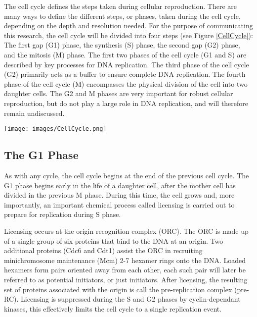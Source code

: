	The cell cycle defines the steps taken during cellular reproduction.
	There are many ways to define the different steps, or phases, taken during the cell cycle, depending on the depth and resolution needed.
	For the purpose of communicating this research, the cell cycle will be divided into four steps (see Figure \ref{CellCycle}):
	The first gap (G1) phase, the synthesis (S) phase, the second gap (G2) phase, and the mitosis (M) phase.
	The first two phases of the cell cycle (G1 and S) are described by key processes for DNA replication.
	The third phase of the cell cycle (G2) primarily acts as a buffer to ensure complete DNA replication.
	The fourth phase of the cell cycle (M) encompasses the physical division of the cell into two daughter cells.
	The G2 and M phases are very important for robust cellular reproduction, but do not play a large role in DNA replication, and will therefore remain undiscussed.
	
	\begin{SCfigure}[1][thb]
		\texttt{[image: images/CellCycle.png]}
		\caption[Cell Cycle]{\label{CellCycle} The complete cell cycle is made up of four phases: 
			The Mitosis (M) phase, when a mother cell separates into two daughter cells. 
			The first Gap (G1) phase, when the daughter cell undergoes growth and chemical preparation for DNA replication.
			The Synthesis (S) phase, when the DNA is replicated.
			And the second Gap (G2) phase which acts as a buffer to ensure complete replication before the M phase.}
	\end{SCfigure}
	
		\subsection{The G1 Phase}
		
		As with any cycle, the cell cycle begins at the end of the previous cell cycle.
		The G1 phase begins early in the life of a daughter cell, after the mother cell has divided in the previous M phase.
		During this time, the cell grows and, more importantly, an important chemical process called licensing is carried out to prepare for replication during S phase.
		
		Licensing occurs at the origin recognition complex (ORC).
		The ORC is made up of a single group of six proteins that bind to the DNA at an origin.
		Two additional proteins (Cdc6 and Cdt1) assist the ORC in recruiting minichromosome maintenance (Mcm) 2-7 hexamer rings onto the DNA.
		Loaded hexamers form pairs oriented away from each other, each such pair will later be referred to as potential initiators, or just initiators.
		After licensing, the resulting set of proteins associated with the origin is call the pre-replication complex (pre-RC).
		Licensing is suppressed during the S and G2 phases by cyclin-dependant kinases, this effectively limits the cell cycle to a single replication event. \cite{MolecularCellBiology}
		
